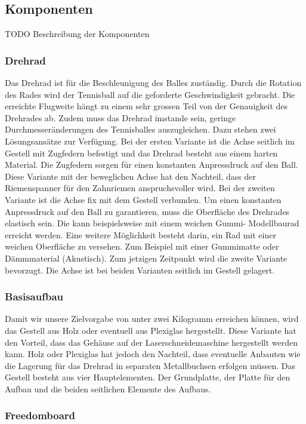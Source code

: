 \subsection{Komponenten}
TODO Beschreibung der Komponenten

\subsubsection{Drehrad}
Das Drehrad ist für die Beschleunigung des Balles zuständig. Durch die Rotation des Rades wird der Tennisball auf die geforderte Geschwindigkeit gebracht. Die erreichte Flugweite hängt zu einem sehr grossen Teil von der Genauigkeit des Drehrades ab. Zudem muss das Drehrad imstande sein, geringe Durchmesseränderungen des Tennisballes auszugleichen. Dazu stehen zwei Lösungsansätze zur Verfügung. Bei der ersten Variante ist die Achse seitlich im Gestell mit Zugfedern befestigt und das Drehrad besteht aus einem harten Material. Die Zugfedern sorgen für einen konstanten Anpressdruck auf den Ball. Diese Variante mit der beweglichen Achse hat den Nachteil, dass der Riemenspanner für den Zahnriemen anspruchsvoller wird. Bei der zweiten Variante ist die Achse fix mit dem Gestell verbunden. Um einen konstanten Anpressdruck auf den Ball zu garantieren, muss die Oberfläche des Drehrades elastisch sein. Die kann beispielsweise mit einem weichen Gummi- Modellbaurad erreicht werden. Eine weitere Möglichkeit besteht darin, ein Rad mit einer weichen Oberfläche zu versehen. Zum Beispiel mit einer Gummimatte oder Dämmmaterial (Akustisch). Zum jetzigen Zeitpunkt wird die zweite Variante bevorzugt. Die Achse ist bei beiden Varianten seitlich im Gestell gelagert.

\subsubsection{Basisaufbau}
Damit wir unsere Zielvorgabe von unter zwei Kilogramm erreichen können, wird das Gestell aus Holz oder eventuell aus Plexiglas hergestellt. Diese Variante hat den Vorteil, dass das Gehäuse auf der Laserschneidemaschine hergestellt werden kann. Holz oder Plexiglas hat jedoch den Nachteil, dass eventuelle Anbauten wie die Lagerung für das Drehrad in separaten Metallbuchsen erfolgen müssen. Das Gestell besteht aus vier Hauptelementen. Der Grundplatte, der Platte für den Aufbau und die beiden seitlichen Elemente des Aufbaus.

\subsubsection{Freedomboard}


